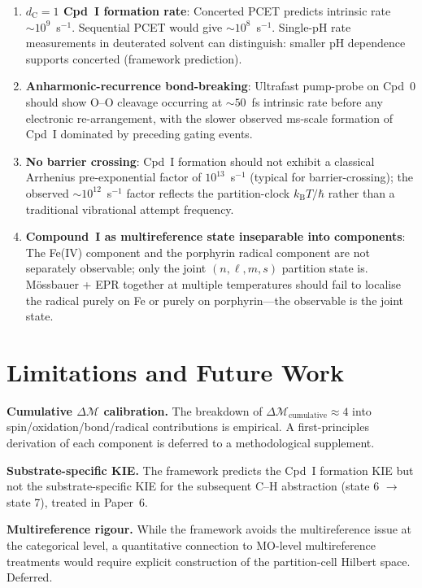\documentclass[11pt,twocolumn,a4paper]{article}
\theoremstyle{definition}
\theoremstyle{remark}
\newcommand{\kB}{k_{\mathrm{B}}}
\newcommand{\depth}{\mathcal{M}}
\newcommand{\dC}{d_{\mathrm{C}}}
\begin{document}
\begin{enumerate}[leftmargin=*, nosep]
\item \textbf{$\dC = 1$ Cpd~I formation rate}: Concerted PCET predicts
  intrinsic rate $\sim 10^9$~s$^{-1}$. Sequential PCET would give
  $\sim 10^8$~s$^{-1}$. Single-pH rate measurements in deuterated solvent
  can distinguish: smaller pH dependence supports concerted (framework
  prediction).

\item \textbf{Anharmonic-recurrence bond-breaking}: Ultrafast pump-probe
  on Cpd~0 should show O--O cleavage occurring at $\sim 50$~fs intrinsic
  rate before any electronic re-arrangement, with the slower observed
  ms-scale formation of Cpd~I dominated by preceding gating events.

\item \textbf{No barrier crossing}: Cpd~I formation should not exhibit a
  classical Arrhenius pre-exponential factor of $10^{13}$~s$^{-1}$
  (typical for barrier-crossing); the observed $\sim 10^{12}$~s$^{-1}$
  factor reflects the partition-clock $\kB T/\hbar$ rather than a
  traditional vibrational attempt frequency.

\item \textbf{Compound~I as multireference state inseparable into
  components}: The Fe(IV) component and the porphyrin radical component
  are not separately observable; only the joint $(n, \ell, m, s)$
  partition state is. M\"{o}ssbauer + EPR together at multiple
  temperatures should fail to localise the radical purely on Fe or
  purely on porphyrin---the observable is the joint state.
\end{enumerate}

\section{Limitations and Future Work}
\label{sec:limits}

\textbf{Cumulative $\Delta\depth$ calibration.} The breakdown of
$\Delta\depth_{\mathrm{cumulative}} \approx 4$ into spin/oxidation/bond/radical
contributions is empirical. A first-principles derivation of each component
is deferred to a methodological supplement.

\textbf{Substrate-specific KIE.} The framework predicts the Cpd~I formation
KIE but not the substrate-specific KIE for the subsequent C--H abstraction
(state 6 $\to$ state 7), treated in Paper~6.

\textbf{Multireference rigour.} While the framework avoids the
multireference issue at the categorical level, a quantitative connection
to MO-level multireference treatments would require explicit construction
of the partition-cell Hilbert space. Deferred.
\end{document}
